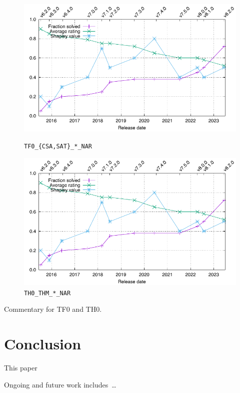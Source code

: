 \documentclass[runningheads]{llncs}
\begin{document}
\begin{figure}[ht!]
\centering
\begin{minipage}[t]{.49\textwidth}
  \centering
  \includegraphics[width=\textwidth]{Plots/GNUPlots/TestData.pdf}
  \vspace*{-2em}
  \caption{{\tt TF0\_\{CSA,SAT\}\_*\_NAR}}
  \label{Plot_TF0_SAT_NAR}
\end{minipage}
\begin{minipage}[t]{.49\textwidth}
  \centering
  \includegraphics[width=\textwidth]{Plots/GNUPlots/TestData.pdf}
  \vspace*{-2em}
  \caption{{\tt TH0\_THM\_*\_NAR}}
  \label{Plot_TH0_THM_NAR}
\end{minipage}
\end{figure}

Commentary for TF0 and TH0.

\section{Conclusion}
\label{Conclusion}

This paper 

Ongoing and future work includes~\ldots



\end{document}
